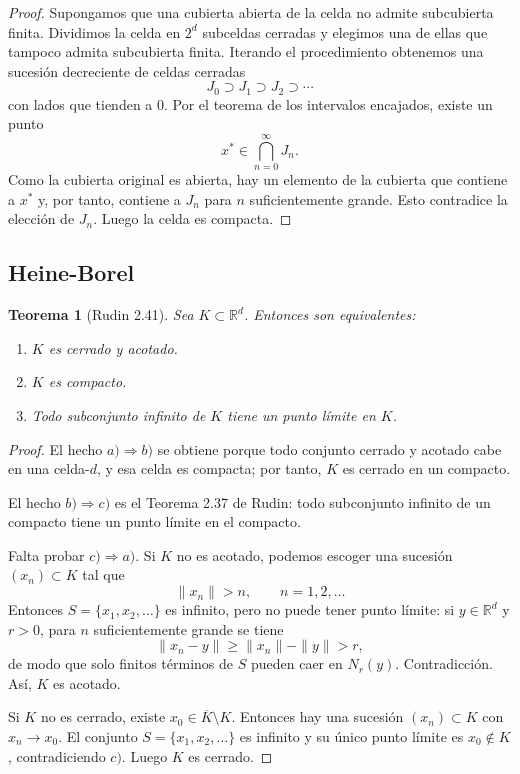 \documentclass[12pt]{article}
\theoremstyle{definition}
\theoremstyle{plain}
\newtheorem{theorem}[definition]{Teorema}
\theoremstyle{remark}
\begin{document}
\begin{proof}
Supongamos que una cubierta abierta de la celda no admite subcubierta finita.
Dividimos la celda en $2^d$ subceldas cerradas y elegimos una de ellas que tampoco admita subcubierta finita.
Iterando el procedimiento obtenemos una sucesión decreciente de celdas cerradas
\[
J_0\supset J_1\supset J_2\supset\cdots
\]
con lados que tienden a $0$.
Por el teorema de los intervalos encajados, existe un punto
\[
x^\ast\in\bigcap_{n=0}^\infty J_n.
\]
Como la cubierta original es abierta, hay un elemento de la cubierta que contiene a $x^\ast$ y, por tanto, contiene a $J_n$ para $n$ suficientemente grande.
Esto contradice la elección de $J_n$.
Luego la celda es compacta.
\end{proof}

\subsection*{Heine-Borel}

\begin{theorem}[Rudin 2.41]
Sea $K\subset\mathbb R^d$.
Entonces son equivalentes:
\begin{enumerate}[label=\alph*)]
    \item $K$ es cerrado y acotado.
    \item $K$ es compacto.
    \item Todo subconjunto infinito de $K$ tiene un punto límite en $K$.
\end{enumerate}
\end{theorem}

\begin{proof}
El hecho $a)\Rightarrow b)$ se obtiene porque todo conjunto cerrado y acotado cabe en una celda-$d$, y esa celda es compacta; por tanto, $K$ es cerrado en un compacto.

El hecho $b)\Rightarrow c)$ es el Teorema 2.37 de Rudin: todo subconjunto infinito de un compacto tiene un punto límite en el compacto.

Falta probar $c)\Rightarrow a)$.
Si $K$ no es acotado, podemos escoger una sucesión $(x_n)\subset K$ tal que
\[
\|x_n\|>n,\qquad n=1,2,\dots
\]
Entonces $S=\{x_1,x_2,\dots\}$ es infinito, pero no puede tener punto límite: si $y\in\mathbb R^d$ y $r>0$, para $n$ suficientemente grande se tiene
\[
\|x_n-y\|\ge \|x_n\|-\|y\|>r,
\]
de modo que solo finitos términos de $S$ pueden caer en $N_r(y)$.
Contradicción.
Así, $K$ es acotado.

Si $K$ no es cerrado, existe $x_0\in\overline K\setminus K$.
Entonces hay una sucesión $(x_n)\subset K$ con $x_n\to x_0$.
El conjunto $S=\{x_1,x_2,\dots\}$ es infinito y su único punto límite es $x_0\notin K$, contradiciendo $c)$.
Luego $K$ es cerrado.
\end{proof}
\end{document}
